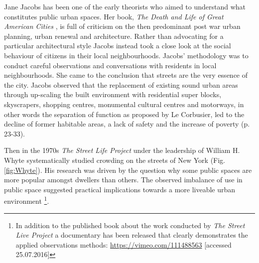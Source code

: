 
 
Jane Jacobs  has been one of the early theorists who aimed to understand what constitutes public urban spaces.
Her book, \textit{The Death and Life of Great American Cities} \cite{Jacobs_1961}, is full of criticism on the then predominant post war urban planning, urban renewal and architecture. 
Rather than advocating for a particular architectural style Jacobs instead took a close look at the social behaviour of citizens in their local neighbourhoods. 
Jacobs' methodology was to conduct careful observations and conversations with residents in local neighbourhoods. 
She came to the conclusion that streets are the very essence of the city. 
Jacobs observed that the replacement of existing sound urban areas through up-scaling the built environment with residential super blocks, skyscrapers, shopping centres, monumental cultural centres and motorways, in other words the separation of function as proposed by Le Corbusier, led to the decline of former habitable areas, a lack of safety and the increase of poverty \cite{Jacobs_1961}(p. 23-33).

Then in the 1970s \textit{The Street Life Project}  under the leadership of William H. Whyte  systematically studied crowding on the streets of New York (Fig. \ref{fig:Whyte}). His research was driven by the question why some public spaces are more popular amongst dwellers than others. The observed imbalance of use in public space suggested practical implications  towards a more liveable urban environment\cite{Whyte_1980} \footnote{In addition to the published book about the work conducted by \textit{The Street Live Project} a documentary has been released that clearly demonstrates the applied observations methods: \url{https://vimeo.com/111488563} [accessed 25.07.2016]}.


